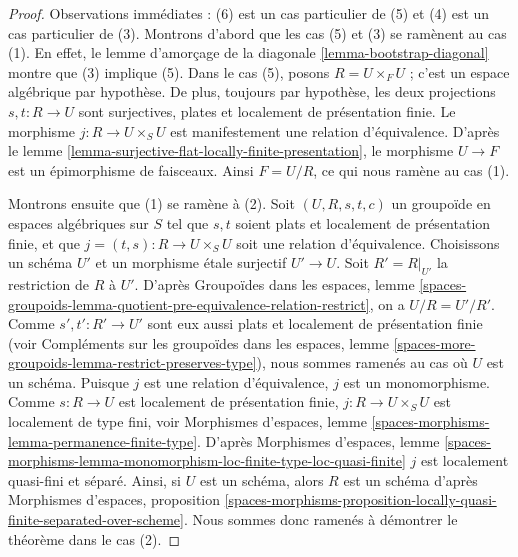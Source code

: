 \begin{proof}
Observations immédiates : (6) est un cas particulier de (5) et
(4) est un cas particulier de (3).
Montrons d'abord que les cas (5) et (3) se ramènent au cas (1).
En effet, le lemme d'amorçage de la diagonale
\ref{lemma-bootstrap-diagonal}
montre que (3) implique (5). Dans le cas (5), posons $R = U \times_F U$ ; c'est
un espace algébrique par hypothèse. De plus, toujours par hypothèse, les deux
projections $s, t : R \to U$ sont surjectives, plates et localement de
présentation finie. Le morphisme $j : R \to U \times_S U$ est manifestement une
relation d'équivalence. D'après le
lemme \ref{lemma-surjective-flat-locally-finite-presentation},
le morphisme $U \to F$ est un épimorphisme de faisceaux. Ainsi $F = U/R$,
ce qui nous ramène au cas (1).

\medskip\noindent
Montrons ensuite que (1) se ramène à (2).
Soit $(U, R, s, t, c)$ un groupoïde en espaces algébriques
sur $S$ tel que $s, t$ soient plats et localement de présentation finie, et que
$j = (t, s) : R \to U \times_S U$ soit une relation d'équivalence.
Choisissons un schéma $U'$ et un morphisme étale surjectif $U' \to U$.
Soit $R' = R|_{U'}$ la restriction de $R$ à $U'$. D'après
Groupoïdes dans les espaces,
lemme \ref{spaces-groupoids-lemma-quotient-pre-equivalence-relation-restrict},
on a $U/R = U'/R'$. Comme $s', t' : R' \to U'$ sont eux aussi
plats et localement de présentation finie (voir
Compléments sur les groupoïdes dans les espaces,
lemme \ref{spaces-more-groupoids-lemma-restrict-preserves-type}),
nous sommes ramenés au cas où $U$ est un schéma.
Puisque $j$ est une relation d'équivalence, $j$ est un monomorphisme.
Comme $s : R \to U$ est localement de présentation finie,
$j : R \to U \times_S U$ est localement de type fini, voir
Morphismes d'espaces, lemme \ref{spaces-morphisms-lemma-permanence-finite-type}.
D'après
Morphismes d'espaces, lemme
\ref{spaces-morphisms-lemma-monomorphism-loc-finite-type-loc-quasi-finite}
$j$ est localement quasi-fini et séparé.
Ainsi, si $U$ est un schéma, alors $R$ est un schéma d'après
Morphismes d'espaces, proposition
\ref{spaces-morphisms-proposition-locally-quasi-finite-separated-over-scheme}.
Nous sommes donc ramenés à démontrer le théorème dans le cas (2).


\end{proof}
